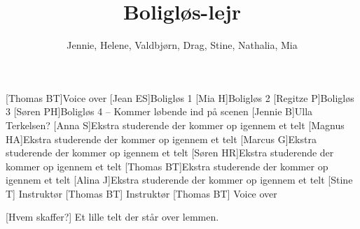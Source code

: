 \documentclass[a4paper,12pt]{article}
\title{Boligløs-lejr}
\author{Jennie, Helene, Valdbjørn, Drag, Stine, Nathalia, Mia}
\begin{document}
\maketitle




\begin{roles}
	[Thomas BT]Voice over
	[Jean ES]Boligløs 1
	[Mia H]Boligløs 2
	[Regitze P]Boligløs 3
	[Søren PH]Boligløs 4 -- Kommer løbende ind på scenen
	[Jennie B]Ulla Terkelsen?
	[Anna S]Ekstra studerende der kommer op igennem et telt
	[Magnus HA]Ekstra studerende der kommer op igennem et telt
	[Marcus G]Ekstra studerende der kommer op igennem et telt
	[Søren HR]Ekstra studerende der kommer op igennem et telt
	[Thomas BT]Ekstra studerende der kommer op igennem et telt
	[Alina J]Ekstra studerende der kommer op igennem et telt
	[Stine T] Instruktør
	[Thomas BT] Instruktør
[Thomas BT] Voice over
\end{roles}


\begin{props}
	[Hvem skaffer?] Et lille telt der står over lemmen.
\end{props}
\end{document}
